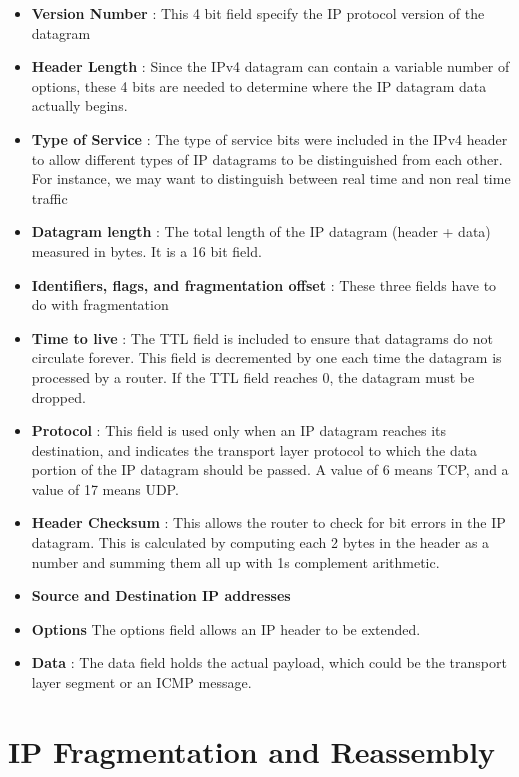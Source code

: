 \documentclass[12pt,letterpaper]{book}
\theoremstyle{definition}
\begin{document}
\begin{itemize}
  \item \textbf{Version Number} : This 4 bit  field specify the IP protocol version of the datagram
  \item \textbf{Header Length}  : Since the IPv4 datagram can contain a variable number of options, these 4 bits are needed to determine where the IP datagram data actually begins.
  \item \textbf{Type of Service} : The type of service bits were included in the IPv4 header to allow different types of IP datagrams to be distinguished from each other. For instance, we may want to distinguish between real time and non real time traffic
  \item \textbf{Datagram length}  : The total length of the IP datagram (header + data) measured in bytes. It is a 16 bit field.
  \item \textbf{Identifiers, flags, and fragmentation offset} : These three fields have to do with fragmentation
  \item \textbf{Time to live} : The TTL field is included to ensure that datagrams do not circulate forever. This field is decremented by one each time the datagram is processed by a router. If the TTL field reaches 0, the datagram must be dropped.
  \item \textbf{Protocol} : This field is used only when an IP datagram reaches its destination, and indicates the transport layer protocol to which the data portion of the IP datagram should be passed. A value of 6 means TCP, and a value of 17 means UDP.
  \item \textbf{Header Checksum} : This allows the router to check for bit errors in the IP datagram. This is calculated by computing each 2 bytes in the header as a number and summing them all up with 1s complement arithmetic.
  \item \textbf{Source and Destination IP addresses} 
  \item \textbf{Options}  The options field allows an IP header to be extended.
  \item \textbf{Data} : The data field holds the actual payload, which could be the transport layer segment or an ICMP message.
\end{itemize} 

\section{IP Fragmentation and Reassembly}
\end{document}
